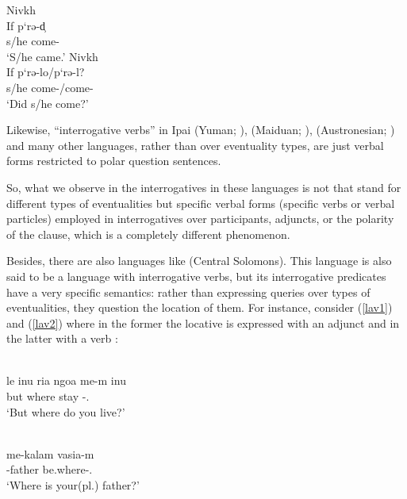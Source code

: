 \documentclass[output=paper]{langsci/langscibook}
\begin{document}
\begin{exe}
\ex\label{nivkh1} Nivkh\\
    \gll If	p‘rə-d̹ \\
            s/he come-\Ind{}\\
            \glt `S/he came.'
\ex\label{nivkh2} Nivkh\\
    \gll If	p‘rə-lo/p‘rə-l?\\
            s/he come-\glossQ{}/come-\glossQ{} \\
            \glt `Did s/he come?'
\end{exe}
%


Likewise, ``interrogative verbs'' in Ipai (Yuman; \citealt{langdon1966}),
 (Maiduan; \citealt{shipley1964}),  (Austronesian;
\citealt{lindstrom.lynch1994}) and many other languages, rather than
 over eventuality types, are just verbal forms restricted to
polar question sentences.

So, what we observe in the interrogatives in these languages is not
 that stand for different types of eventualities but specific
verbal forms (specific verbs or verbal particles) employed in interrogatives
over participants, adjuncts, or the polarity of the clause, which is a
completely different phenomenon.

Besides, there are also languages like  (Central Solomons). This
language is also said to be a language with interrogative verbs, but its
interrogative predicates have a very specific semantics: rather than expressing
queries over types of eventualities, they question the location of them. For
instance, consider (\ref{lav1}) and (\ref{lav2}) where in the former the
locative is expressed with an adjunct and in the latter with a verb
\citep[from][457 and 460]{terrill2003}:

\begin{exe}
\ex \label{lav1} \\
\gll le inu ria ngoa me-m inu\\
but \Ssg{} where stay \Hab{}-\Sg.\M{} \Ssg{}\\
\glt `But where do you live?'

\ex \label{lav2} \\
\gll me-kalam vasia-m\\
\Spl{}-father be.where-\Sg.\M{}\\
\glt `Where is your(pl.) father?'
\end{exe}
\end{document}
